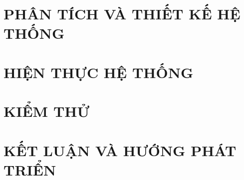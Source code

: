 \documentclass[12pt, a4paper]{report}
\begin{document}
\chapter{\textbf{PHÂN TÍCH VÀ THIẾT KẾ HỆ THỐNG}}
\newpage

\newpage
\chapter{\textbf{HIỆN THỰC HỆ THỐNG}}
\newpage

\newpage

\chapter{\textbf{KIỂM THỬ}}
\newpage

\newpage

\chapter{\textbf{KẾT LUẬN VÀ HƯỚNG PHÁT TRIỂN}}
\newpage


\end{document}
